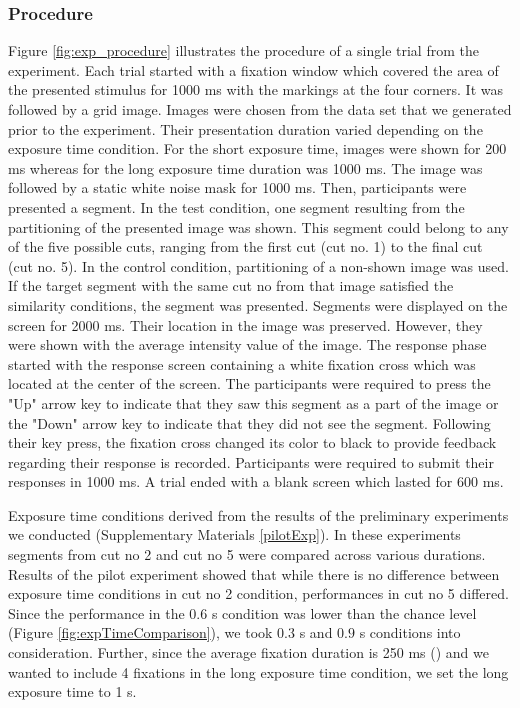 \documentclass{article}
\begin{document}
\subsubsection{Procedure}
Figure \ref{fig:exp_procedure} illustrates the procedure of a single trial from the experiment. Each trial started with a fixation window which covered the area of the presented stimulus for 1000 ms with the markings at the four corners. It was followed by a grid image. Images were chosen from the data set that we generated prior to the experiment. Their presentation duration varied depending on the exposure time condition. For the short exposure time, images were shown for 200 ms whereas for the long exposure time duration was 1000 ms. The image was followed by a static white noise mask for 1000 ms. Then, participants were presented a segment. In the test condition, one segment resulting from the partitioning of the presented image was shown. This segment could belong to any of the five possible cuts, ranging from the first cut (cut no. 1) to the final cut (cut no. 5). In the control condition, partitioning of a non-shown image was used. If the target segment with the same cut no from that image satisfied the similarity conditions, the segment was presented. Segments were displayed on the screen for 2000 ms. Their location in the image was preserved. However, they were shown with the average intensity value of the image. The response phase started with the response screen containing a white fixation cross which was located at the center of the screen. The participants were required to press the "Up" arrow key to indicate that they saw this segment as a part of the image or the "Down" arrow key to indicate that they did not see the segment. Following their key press, the fixation cross changed its color to black to provide feedback regarding their response is recorded. Participants were required to submit their responses in 1000 ms. A trial ended with a blank screen which lasted for 600 ms.

Exposure time conditions derived from the results of the preliminary experiments we conducted (Supplementary Materials \ref{pilotExp}). In these experiments segments from cut no 2 and cut no 5 were compared across various durations. Results of the pilot experiment showed that while there is no difference between exposure time conditions in cut no 2 condition, performances in cut no 5 differed. Since the performance in the $0.6$ s condition was lower than the chance level (Figure \ref{fig:expTimeComparison}), we took $0.3$ s and $0.9$ s conditions into consideration. Further, since the average fixation duration is 250 ms (\cite{unema2005time}) and we wanted to include 4 fixations in the long exposure time condition, we set the long exposure time to 1 s.
\end{document}
